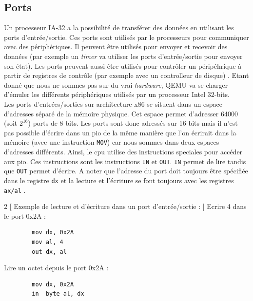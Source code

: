 
\subsection{Ports}
Un processeur \acrshort{IA-32} a la possibilité de transférer des données en utilisant
les ports d'entrée/sortie. Ces ports sont utilisés par le processeurs pour communiquer
avec des périphériques. Il peuvent être utilisés pour envoyer et recevoir des données
(par exemple un \textit{timer} va utiliser les ports d'entrée/sortie pour envoyer
son état). Les ports peuvent aussi être utilisés pour contrôler un péripéhrique
à partir de registres de contrôle (par exemple avec un controlleur de disque) \cite{ref64}.
Etant donné que nous ne sommes pas sur du vrai \textit{hardware}, QEMU va se charger
d'émuler les différents périphériques utilisés par un processeur Intel 32-bits. \\

Les ports d'entrées/sorties sur architecture x86 se situent dans un espace d'adresses
séparé de la mémoire physique. Cet espace permet d'adresser 64000 (soit $2^{16}$)
ports de 8 bits. Les ports sont donc adressés sur 16 bits mais  il n'est pas possible
d'écrire dans un \acrshort{pio} de la même manière que l'on écrirait dans la mémoire
(avec une instruction  \texttt{MOV}) car nous sommes dans deux
espaces d'adresses différents. Ainsi, le \acrshort{cpu} utilise des instructions speciales
pour accéder aux \acrshort{pio}. Ces instructions sont les instructions
\texttt{IN} et \texttt{OUT}. \texttt{IN} permet de lire
tandis que \texttt{OUT} permet d'écrire. A noter que l'adresse du port
doit toujours être spécifiée dans le registre \texttt{dx} et la lecture
et l'écriture se font toujours avec les registres \texttt{ax/al} \cite{ref42}. \\

\begin{multicols}{2}
    [
    Exemple de lecture et d'écriture dans un port d'entrée/sortie :
    ]
    Ecrire 4 dans le port 0x2A :
    \begin{verbatim}
        mov dx, 0x2A
        mov al, 4
        out dx, al
    \end{verbatim}
    \columnbreak
    Lire un octet depuis le port 0x2A :
    \begin{verbatim}
        mov dx, 0x2A
        in  byte al, dx
    \end{verbatim}
\end{multicols}

